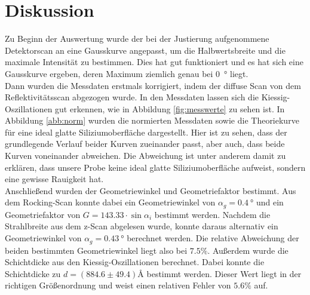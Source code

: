 \section{Diskussion}
\label{sec:Diskussion}
Zu Beginn der Auswertung wurde der bei der Justierung aufgenommene Detektorscan an eine Gausskurve angepasst, um die Halbwertsbreite und die maximale Intensität zu bestimmen. Dies hat gut funktioniert und es hat sich eine Gausskurve ergeben, deren Maximum ziemlich genau bei \SI{0}{\degree} liegt. \\
\newline
Dann wurden die Messdaten erstmals korrigiert, indem der diffuse Scan von dem Reflektivitätsscan abgezogen wurde. In den Messdaten lassen sich die Kiessig-Oszillationen gut erkennen, wie in Abbildung \ref{fig:messwerte} zu sehen ist. 
\newline
In Abbildung \ref{abb:norm} wurden die normierten Messdaten sowie die Theoriekurve für eine ideal glatte Siliziumoberfläche dargestellt. Hier ist zu sehen, dass der grundlegende Verlauf beider Kurven zueinander passt, aber auch, dass beide Kurven voneinander abweichen. Die Abweichung ist unter anderem damit zu erklären, dass unsere Probe keine ideal glatte Siliziumoberfläche aufweist, sondern eine gewisse Rauigkeit hat. \\
\newline
Anschließend wurden der Geometriewinkel und Geometriefaktor bestimmt. Aus dem Rocking-Scan konnte dabei ein Geometriewinkel von $\alpha_g = \SI{0.4}{\degree}$ und ein Geometriefaktor von $G = \num{143.33} \cdot \sin \alpha_i$ bestimmt werden. Nachdem die Strahlbreite aus dem z-Scan abgelesen wurde, konnte daraus alternativ ein Geometriewinkel von $\alpha_g = \SI{0.43}{\degree}$ berechnet werden. Die relative Abweichung der beiden bestimmten Geometriewinkel liegt also bei $7.5\%$. 
\newline
Außerdem wurde die Schichtdicke aus den Kiessig-Oszillationen berechnet. Dabei konnte die Schichtdicke zu $d = (884.6 \pm 49.4) \text{\AA}$ bestimmt werden. Dieser Wert liegt in der richtigen Größenordnung und weist einen relativen Fehler von $5.6\%$ auf.